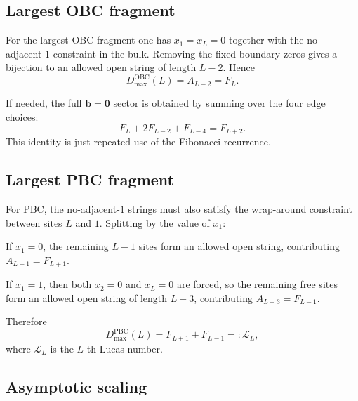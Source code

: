 \documentclass[aps,prb,reprint,twocolumn,amsmath,amssymb,citeautoscript]{revtex4-2}
\begin{document}
\subsection{Largest OBC fragment}
\label{app:fibonacci:OBC}

For the largest OBC fragment one has \(x_1=x_L=0\) together with the no-adjacent-\(1\) constraint in the bulk. Removing the fixed boundary zeros gives a bijection to an allowed open string of length \(L-2\). Hence
\begin{equation}
D_{\max}^{\mathrm{OBC}}(L)=A_{L-2}=F_L.
\label{eq:app:OBCdim}
\end{equation}

If needed, the full \(\mathbf b=\mathbf 0\) sector is obtained by summing over the four edge choices:
\begin{equation}
F_L+2F_{L-2}+F_{L-4}=F_{L+2}.
\label{eq:app:OBCsum}
\end{equation}
This identity is just repeated use of the Fibonacci recurrence.

\subsection{Largest PBC fragment}
\label{app:fibonacci:PBC}

For PBC, the no-adjacent-\(1\) strings must also satisfy the wrap-around constraint between sites \(L\) and \(1\). Splitting by the value of \(x_1\):

If \(x_1=0\), the remaining \(L-1\) sites form an allowed open string, contributing \(A_{L-1}=F_{L+1}\).

If \(x_1=1\), then both \(x_2=0\) and \(x_L=0\) are forced, so the remaining free sites form an allowed open string of length \(L-3\), contributing \(A_{L-3}=F_{L-1}\).

Therefore
\begin{equation}
D_{\max}^{\mathrm{PBC}}(L)=F_{L+1}+F_{L-1}=: \mathcal L_L,
\label{eq:app:PBCdim}
\end{equation}
where \(\mathcal L_L\) is the \(L\)-th Lucas number.

\subsection{Asymptotic scaling}
\label{app:fibonacci:strong}
\end{document}
